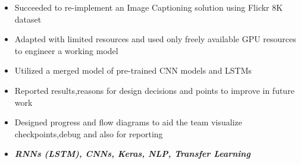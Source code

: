 \documentclass[10pt,a4paper]{altacv}
\begin{document}

\begin{fullwidth}
\makecvheader
\end{fullwidth}



\begin{itemize}
\item Succeeded to re-implement an Image Captioning solution using Flickr 8K dataset
\item Adapted with limited resources and used only freely available GPU resources to engineer a working model
\item Utilized a merged  model of pre-trained CNN models and LSTMs
\item Reported results,reasons for design decisions and points to improve in future work 
\item Designed progress and flow diagrams to aid the team  visualize checkpoints,debug and also for reporting
\item \textit{\textbf{RNNs (LSTM), CNNs, Keras, NLP, Transfer Learning}}
\end{itemize}

\divider
\end{document}
